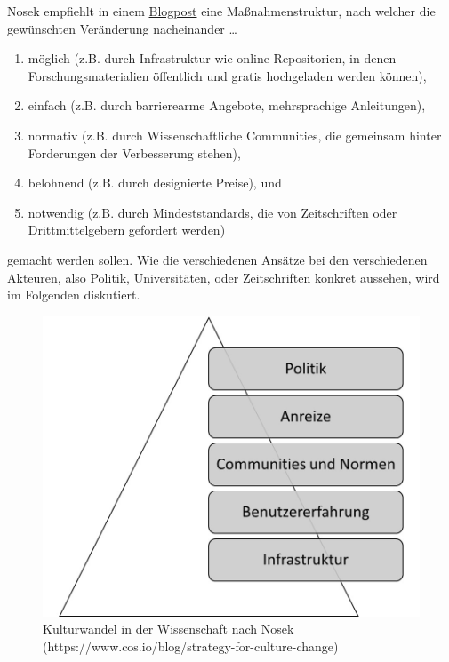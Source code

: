 \documentclass[
  letterpaper,
  DIV=11,
  numbers=noendperiod]{scrreprt}
\providecommand{\tightlist}{%
  \setlength{\itemsep}{0pt}\setlength{\parskip}{0pt}}\usepackage{longtable,booktabs,array}
\begin{document}
Nosek empfiehlt in einem
\href{https://www.cos.io/blog/strategy-for-culture-change}{Blogpost}
eine Maßnahmenstruktur, nach welcher die gewünschten Veränderung
nacheinander \ldots{}

\begin{enumerate}
\def\labelenumi{\arabic{enumi}.}
\tightlist
\item
  möglich (z.B. durch Infrastruktur wie online Repositorien, in denen
  Forschungsmaterialien öffentlich und gratis hochgeladen werden
  können),
\item
  einfach (z.B. durch barrierearme Angebote, mehrsprachige Anleitungen),
\item
  normativ (z.B. durch Wissenschaftliche Communities, die gemeinsam
  hinter Forderungen der Verbesserung stehen),
\item
  belohnend (z.B. durch designierte Preise), und
\item
  notwendig (z.B. durch Mindeststandards, die von Zeitschriften oder
  Drittmittelgebern gefordert werden)
\end{enumerate}

gemacht werden sollen. Wie die verschiedenen Ansätze bei den
verschiedenen Akteuren, also Politik, Universitäten, oder Zeitschriften
konkret aussehen, wird im Folgenden diskutiert.

\begin{figure}[H]

{\centering \includegraphics{images/pyramide.jpg}

}

\caption{Kulturwandel in der Wissenschaft nach Nosek
(https://www.cos.io/blog/strategy-for-culture-change)}

\end{figure}%
\end{document}
